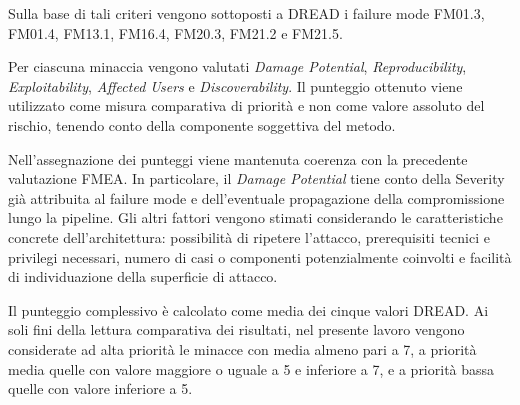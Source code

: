Sulla base di tali criteri vengono sottoposti a DREAD i failure mode FM01.3, FM01.4, FM13.1, FM16.4, FM20.3, FM21.2 e FM21.5.

Per ciascuna minaccia vengono valutati \textit{Damage Potential}, \textit{Reproducibility}, \textit{Exploitability}, \textit{Affected Users} e \textit{Discoverability}. Il punteggio ottenuto viene utilizzato come misura comparativa di priorità e non come valore assoluto del rischio, tenendo conto
della componente soggettiva del metodo.

Nell'assegnazione dei punteggi viene mantenuta coerenza con la precedente valutazione FMEA. In particolare, il \textit{Damage Potential} tiene conto della Severity già attribuita al failure mode e dell'eventuale propagazione della compromissione lungo la pipeline. Gli altri fattori vengono stimati considerando le caratteristiche concrete dell'architettura: possibilità di ripetere l'attacco,
prerequisiti tecnici e privilegi necessari, numero di casi o componenti potenzialmente coinvolti e facilità di individuazione della superficie di attacco.

Il punteggio complessivo è calcolato come media dei cinque valori DREAD. Ai soli fini della lettura comparativa dei risultati, nel presente lavoro vengono considerate ad alta priorità le minacce con media almeno pari a 7, a priorità media quelle con valore maggiore o uguale a 5 e inferiore a 7, e a priorità bassa quelle con valore inferiore a 5.








